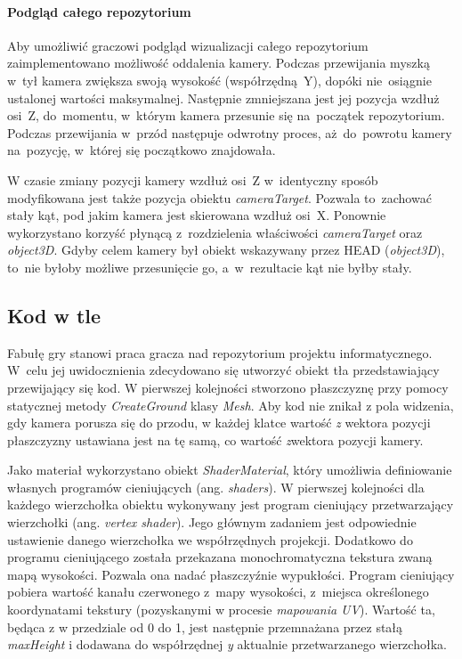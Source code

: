 \documentclass[12pt,a4paper,polish,thesis]{dcsbook}
\begin{document}
{	\paragraph{Podgląd całego repozytorium}

	Aby umożliwić graczowi podgląd wizualizacji całego repozytorium zaimplementowano możliwość oddalenia kamery. Podczas przewijania myszką w~tył kamera zwiększa swoją wysokość (współrzędną~Y), dopóki nie~osiągnie ustalonej wartości maksymalnej. Następnie zmniejszana jest jej pozycja wzdłuż osi~Z, do~momentu, w~którym kamera przesunie się na~początek repozytorium. Podczas przewijania w~przód następuje odwrotny proces, aż~do~powrotu kamery na~pozycję, w~której się początkowo znajdowała.

	W czasie zmiany pozycji kamery wzdłuż osi~Z w~identyczny sposób modyfikowana jest także pozycja obiektu \textit{cameraTarget}. Pozwala to~zachować stały kąt, pod jakim kamera jest skierowana wzdłuż osi~X. Ponownie wykorzystano korzyść płynącą z~rozdzielenia właściwości \textit{cameraTarget} oraz \textit{object3D}. Gdyby celem kamery był obiekt wskazywany przez HEAD (\textit{object3D}), to~nie byłoby możliwe przesunięcie go, a~w~rezultacie kąt nie byłby stały.

	\subsection{Kod w tle}

	Fabułę gry stanowi praca gracza nad repozytorium projektu informatycznego. W~celu jej uwidocznienia zdecydowano się utworzyć obiekt tła przedstawiający przewijający się kod. W pierwszej kolejności stworzono płaszczyznę przy pomocy statycznej metody \textit{CreateGround} klasy \textit{Mesh}. Aby kod nie znikał z pola widzenia, gdy kamera porusza się do przodu, w każdej klatce wartość \textit{z} wektora pozycji płaszczyzny ustawiana jest na tę samą, co wartość \textit{z}wektora pozycji kamery.
	
	Jako materiał wykorzystano obiekt \textit{ShaderMaterial}, który umożliwia definiowanie własnych programów cieniujących (ang. \textit{shaders}). W pierwszej kolejności dla każdego wierzchołka obiektu wykonywany jest program cieniujący przetwarzający wierzchołki (ang. \textit{vertex shader}). Jego głównym zadaniem jest odpowiednie ustawienie danego wierzchołka we współrzędnych projekcji. Dodatkowo do programu cieniującego została przekazana monochromatyczna tekstura zwaną mapą wysokości. Pozwala ona nadać płaszczyźnie wypukłości. Program cieniujący pobiera wartość kanału czerwonego z~mapy wysokości, z~miejsca określonego koordynatami tekstury (pozyskanymi w procesie \textit{mapowania UV}). Wartość ta, będąca z w przedziale od 0 do 1, jest następnie przemnażana przez stałą \textit{maxHeight} i dodawana do współrzędnej \textit{y} aktualnie przetwarzanego wierzchołka.
	
}
\end{document}
